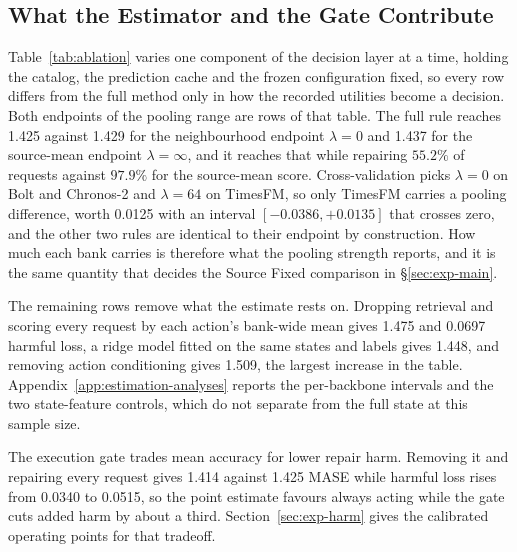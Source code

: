\documentclass{article}
\begin{document}
\subsection{What the Estimator and the Gate Contribute}
\label{sec:exp-ablation}
Table~\ref{tab:ablation} varies one component of the decision layer at a time, holding the
catalog, the prediction cache and the frozen configuration fixed, so every row differs from
the full method only in how the recorded utilities become a decision. Both endpoints of the
pooling range are rows of that table. The full rule reaches 1.425 against 1.429 for the
neighbourhood endpoint $\lambda=0$ and 1.437 for the source-mean endpoint
$\lambda=\infty$, and it reaches that while repairing $55.2\%$ of requests against $97.9\%$
for the source-mean score. Cross-validation picks $\lambda=0$ on Bolt and Chronos-2 and
$\lambda=64$ on TimesFM, so only TimesFM carries a pooling difference, worth 0.0125 with an
interval $[-0.0386,+0.0135]$ that crosses zero, and the other two rules are identical to
their endpoint by construction. How much each bank carries is therefore what the pooling
strength reports, and it is the same quantity that decides the Source Fixed comparison in
\S\ref{sec:exp-main}.

The remaining rows remove what the estimate rests on. Dropping retrieval and scoring every
request by each action's bank-wide mean gives 1.475 and 0.0697 harmful loss, a ridge model
fitted on the same states and labels gives 1.448, and removing action conditioning gives
1.509, the largest increase in the table. Appendix~\ref{app:estimation-analyses} reports the
per-backbone intervals and the two state-feature controls, which do not separate from the
full state at this sample size.

The execution gate trades mean accuracy for lower repair harm. Removing it and repairing
every request gives 1.414 against 1.425 MASE while harmful loss rises from 0.0340 to 0.0515,
so the point estimate favours always acting while the gate cuts added harm by about a third.
Section~\ref{sec:exp-harm} gives the calibrated operating points for that tradeoff.
\end{document}
